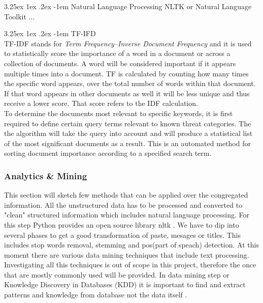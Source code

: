 \documentclass[12pt]{article}
\makeatletter
\newcounter{subsubsubsection}[subsubsection]
\renewcommand\paragraph{\@startsection{paragraph}{5}{\z@}%
  {3.25ex \@plus1ex \@minus.2ex}%
  {-1em}%
  {\normalfont\normalsize\bfseries}}
\makeatother
\begin{document}
\paragraph{Natural Language Processing}
NLTK or Natural Language Toolkit ...


\paragraph{TF-IFD}
\hfill \break
\\
TF-IDF \cite{tf-idf} stands for \textit{Term Frequency–Inverse Document Frequency} and it is used to statistically score the importance of a word in a document or across a collection of documents. A word will be considered important if it appears multiple times into a document. TF is calculated by counting how many times the specific word appears, over the total number of words within that document. If that word appears in other documents as well it will be less unique and thus receive a lower score. That score refers to the IDF calculation. 
\hfill \break 
\\
To determine the documents most relevant to specific keywords, it is first required to define certain query terms relevant to known threat categories. The the algorithm will take the query into account and will produce a statistical list of the most significant documents as a result. This is an automated method for sorting document importance according to a specified search term. 
\newpage
\subsubsection{Analytics \& Mining}
This section will sketch few methods that can be applied over the congregated information. All the unstructured data has to be processed and converted to "clean" structured information which includes natural language processing. For this step Python provides an open source library nltk \cite{nltk}. We have to dip into several phases to get a good transformation of  paste, mesages or titles. This includes stop words removal, stemming and pos(part of speach) detection. 
At this moment there are various data mining techniques \cite{oracle-list} that include text processing. Investigating all this techniques is out of scope in this project, therefore the once that are mostly commonly used will be provided. In data mining step or Knowledge Discovery in Databases (KDD) it is important to find and extract patterns and knowledge from database not the data itself \cite{data-kdd}.
\end{document}
